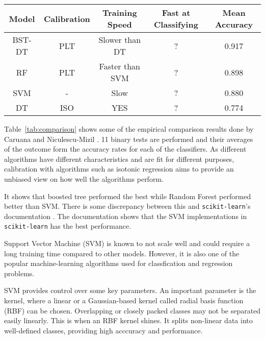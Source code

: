 \documentclass[lit_review.tex]{subfiles}
\begin{document}
\parbox{\linewidth}{
  \centering
  \begin{tabular}{|c|c|c|c|c|}
    \hline
    Model    & Calibration & Training Speed  & Fast at Classifying & Mean Accuracy
    \\\hline
    BST-DT   & PLT         & Slower than DT  & ?                   & 0.917
    \\\hline
    RF       & PLT         & Faster than SVM & ?                   & 0.898
    \\\hline
    SVM      & -           & Slow            & ?                   & 0.880
    \\\hline
    DT       & ISO         & YES             & ?                   & 0.774
    \\\hline
  \end{tabular}

  \label{tab:comparison}
}

Table~\ref{tab:comparison} shows some of the empirical comparison results done by Caruana and Niculescu-Mizil \cite{compare-supervised}. 11 binary tests are performed and their averages of the outcome form the accuracy rates for each of the classifiers. As different algorithms have different characteristics and are fit for different purposes, calibration with algorithms such as isotonic regression aims to provide an unbiased view on how well the algorithms perform.

It shows that boosted tree performed the best while Random Forest performed better than SVM. There is some discrepancy between this and \texttt{scikit-learn}'s documentation \cite{scikit-docs-supervised-compare}. The documentation shows that the SVM implementations in \texttt{scikit-learn} has the best performance. 

Support Vector Machine (SVM) is known to not scale well and could require a long training time compared to other models. \cite{compare-supervised} However, it is also one of the popular machine-learning algorithms used for classfication and regression problems. 

SVM provides control over some key parameters. An important parameter is the kernel, where a linear or a Gaussian-based kernel called radial basis function (RBF) can be chosen. Overlapping or closely packed classes may not be separated easily linearly. This is when an RBF kernel shines. It splits non-linear data into well-defined classes, providing high acccuracy and performance. 
\end{document}
